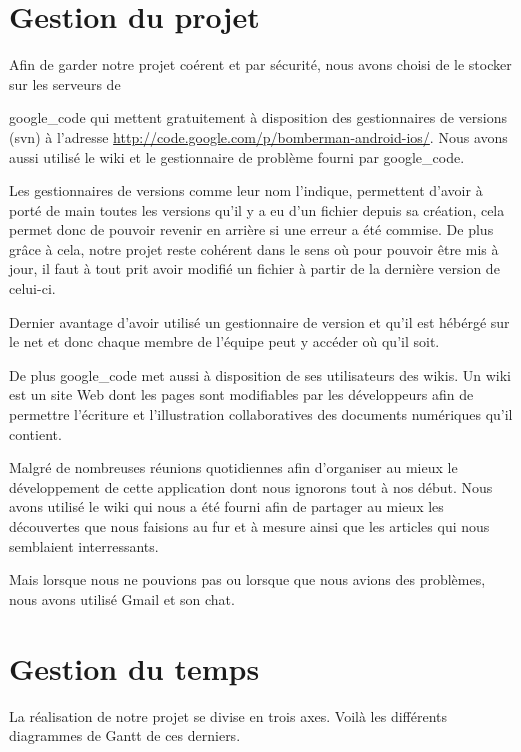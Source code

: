 \section{Gestion du projet}
	Afin de garder notre projet coérent et par sécurité, nous avons choisi de le
	stocker sur les serveurs de {\gls{google_code} qui mettent gratuitement à
	disposition des gestionnaires de versions (\gls{svn}) à l'adresse \url{http://code.google.com/p/bomberman-android-ios/}. Nous avons aussi utilisé le wiki et le gestionnaire de problème fourni par \gls{google_code}.
	
	Les gestionnaires de versions comme leur nom l'indique, permettent d'avoir à
	porté de main toutes les versions qu'il y a eu d'un fichier depuis sa
	création, cela permet donc de pouvoir revenir en arrière si une erreur a été commise.
	De plus grâce à cela, notre projet reste cohérent dans le sens où pour pouvoir
	être mis à jour, il faut à tout prit avoir modifié un fichier à partir de la
	dernière version de celui-ci.
		
	Dernier avantage d'avoir utilisé un gestionnaire de version et qu'il est
	hébérgé sur le net et donc chaque membre de l'équipe peut y accéder où qu'il
	soit. 
		
	De plus \gls{google_code} met aussi à disposition de ses utilisateurs des \glspl{wiki}.
	Un \gls{wiki} est un site Web dont les pages sont modifiables par les développeurs
	afin de permettre l'écriture et l'illustration collaboratives des documents numériques qu'il contient.
	
	Malgré de nombreuses réunions quotidiennes afin d'organiser au mieux le développement de cette application dont nous ignorons
	tout à nos début. Nous avons utilisé le \gls{wiki} qui nous a été fourni afin de partager au mieux
	les découvertes que nous faisions au fur et à mesure ainsi que les articles qui nous semblaient interressants.
	
	Mais lorsque nous ne pouvions pas ou lorsque que nous avions des problèmes, nous avons utilisé Gmail et son chat.
	

\section{Gestion du temps}
	La réalisation de notre projet se divise en trois axes. Voilà les différents diagrammes de Gantt de ces derniers.
	
}
